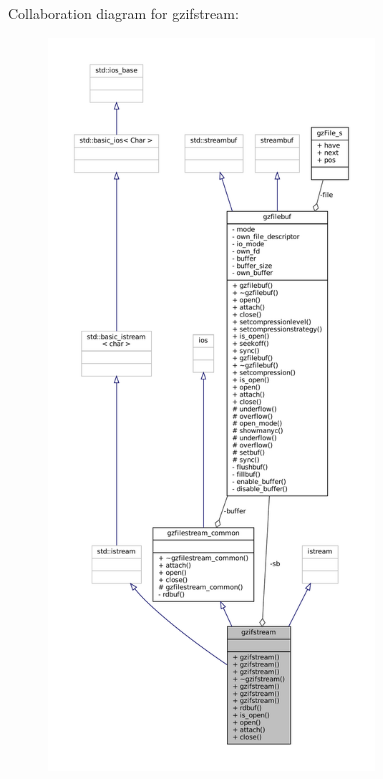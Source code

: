 Collaboration diagram for gzifstream\+:
\nopagebreak
\begin{figure}[H]
\begin{center}
\leavevmode
\includegraphics[height=550pt]{classgzifstream__coll__graph}
\end{center}
\end{figure}
